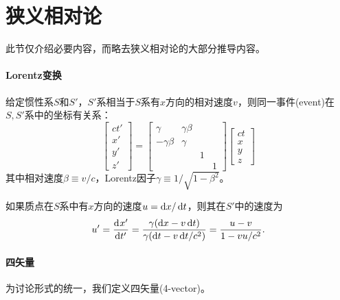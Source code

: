 \section{狭义相对论}
此节仅介绍必要内容，而略去狭义相对论的大部分推导内容。%
\paragraph{Lorentz变换}
给定惯性系$S$和$S'$，$S'$系相当于$S$系有$x$方向的相对速度$v$，则同一事件(event)在$S,S'$系中的坐标有关系：
\begin{equation}
	\begin{bmatrix}
		ct'\\x'\\y'\\z'
	\end{bmatrix}=
	\begin{bmatrix}
		\gamma&\gamma\beta\\-\gamma\beta&\gamma\\ &&1\\ &&&1
	\end{bmatrix}
	\begin{bmatrix}
		ct\\x\\y\\z
	\end{bmatrix}
\end{equation}
其中相对速度$\beta\equiv v/c$，Lorentz因子$\gamma\equiv 1/\sqrt{1-\beta^2}$。

如果质点在$S$系中有$x$方向的速度$u=\mathop{}\!\mathrm{d} x/\mathop{}\!\mathrm{d} t$，则其在$S'$中的速度为
\begin{equation}
    u'=\frac{\mathrm{d}^{{}}x'}{\mathrm{d}{t'}^{{}}}=\frac{\gamma(\mathop{}\!\mathrm{d} x-v\mathop{}\!\mathrm{d} t)}{\gamma(\mathop{}\!\mathrm{d} t-v\mathop{}\!\mathrm{d} t/c^2)}=\frac{u-v}{1-vu/c^2}.
\end{equation}

\paragraph{四矢量}

为讨论形式的统一，我们定义四矢量(4-vector)。

